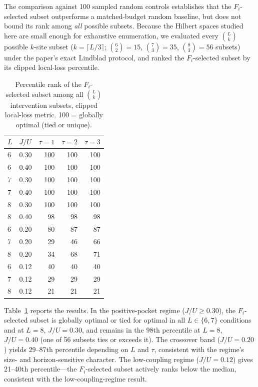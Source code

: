 \documentclass[aps,prresearch,reprint,amsmath,amssymb,longbibliography,floatfix]{revtex4-2}
\newcommand{\Fi}{F_i}
\begin{document}
The comparison against 100 sampled random controls establishes that
the $\Fi$-selected subset outperforms a matched-budget random baseline,
but does not bound its rank among \emph{all} possible subsets.
Because the Hilbert spaces studied here are small enough for exhaustive
enumeration, we evaluated every $\binom{L}{k}$ possible $k$-site subset
($k=\lceil L/3\rceil$; $\binom{6}{2}=15$, $\binom{7}{3}=35$,
$\binom{8}{3}=56$ subsets) under the paper's exact Lindblad protocol,
and ranked the $\Fi$-selected subset by its clipped local-loss percentile.

\begin{table}[tbp]
\centering
\caption{Percentile rank of the $\Fi$-selected subset among all
$\binom{L}{k}$ intervention subsets, clipped local-loss metric.
100 = globally optimal (tied or unique).}
\label{tab:exhaustive}
\begin{ruledtabular}
\begin{tabular}{llrrr}
$L$ & $J/U$ & $\tau=1$ & $\tau=2$ & $\tau=3$ \\
\hline
6 & 0.30 & 100 & 100 & 100 \\
6 & 0.40 & 100 & 100 & 100 \\
7 & 0.30 & 100 & 100 & 100 \\
7 & 0.40 & 100 & 100 & 100 \\
8 & 0.30 & 100 & 100 & 100 \\
8 & 0.40 &  98 &  98 &  98 \\
\hline
6 & 0.20 &  80 &  87 &  87 \\
7 & 0.20 &  29 &  46 &  66 \\
8 & 0.20 &  34 &  68 &  71 \\
\hline
6 & 0.12 &  40 &  40 &  40 \\
7 & 0.12 &  29 &  29 &  29 \\
8 & 0.12 &  21 &  21 &  21 \\
\end{tabular}
\end{ruledtabular}
\end{table}

Table~\ref{tab:exhaustive} reports the results.
In the positive-pocket regime ($J/U\geq0.30$), the $\Fi$-selected subset
is globally optimal or tied for optimal in all $L\in\{6,7\}$ conditions
and at $L=8$, $J/U=0.30$, and remains in the 98th percentile at
$L=8$, $J/U=0.40$ (one of 56 subsets ties or exceeds it).
The crossover band ($J/U=0.20$) yields 29--87th percentile depending on
$L$ and $\tau$, consistent with the regime's size- and horizon-sensitive
character.
The low-coupling regime ($J/U=0.12$) gives 21--40th percentile---the
$\Fi$-selected subset actively ranks below the median, consistent with
the low-coupling-regime result.
\end{document}
